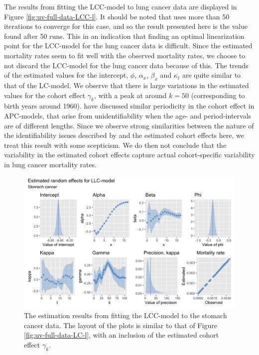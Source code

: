 \newpar The results from fitting the LCC-model to lung cancer data are displayed in Figure \ref{fig:uv-full-data-LCC-l}. It should be noted that \inlabru uses more than 50 iterations to converge for this case, and so the result presented here is the value found after 50 runs. This in an indication that finding an optimal linearization point for the LCC-model for the lung cancer data is difficult. Since the estimated mortality rates seem to fit well with the observed mortality rates, we choose to not discard the LCC-model for the lung cancer data because of this. The trends of the estimated values for the intercept, $\phi$, $\alpha_x$, $\beta_x$ and $\kappa_t$ are quite similar to that of the LC-model. We observe that there is large variations in the estimated values for the cohort effect $\gamma_k$, with a peak at around $k = 50$ (corresponding to birth years around 1960). \textcite{RieblerThesis2010} have discussed similar periodicity in the cohort effect in APC-models, that arise from unidentifiability when the age- and period-intervals are of different lengths. Since we observe strong similarities between the nature of the identifiability issues described by \textcite{RieblerThesis2010} and the estimated cohort effects here, we treat this result with some scepticism. We do then not conclude that the variability in the estimated cohort effects capture actual cohort-specific variability in lung cancer mortality rates. 

\begin{figure}[h!]
    \centering
    \includegraphics[width=0.85\linewidth]{real-data/real-data-univariate/Figures/uv-full-data-lcc-s.png}
    \caption{The estimation results from fitting the LCC-model to the stomach cancer data. The layout of the plots is similar to that of Figure \ref{fig:uv-full-data-LC-l}, with an inclusion of the estimated cohort effect $\gamma_k$.}
    \label{fig:uv-full-data-LCC-s}
\end{figure}

